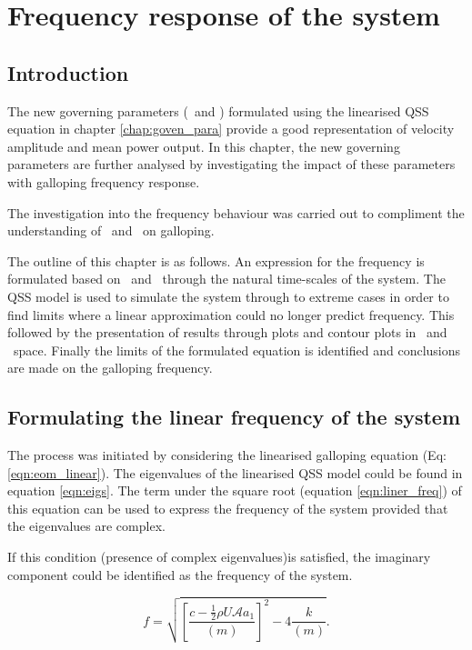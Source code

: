 \chapter{Frequency response of the system}

\section{Introduction}

The new governing parameters (\massstiff\ and \massdamp) formulated using the linearised QSS equation in chapter \ref{chap:goven_para} provide a good representation of velocity amplitude and mean power output. In this chapter, the new governing parameters are further analysed by investigating the impact of these parameters with galloping frequency response. 

The investigation into the frequency behaviour was carried out to compliment the understanding of \massstiff\ and \massdamp\ on galloping. 

The outline of this chapter is as follows. An expression for the frequency is formulated based on \massstiff\ and \massdamp\ through the natural time-scales of the system. The QSS model is used to simulate the system through to  extreme cases in order to find limits where a linear approximation could no longer predict frequency. This followed by the presentation of results through plots and contour plots in \massstiff\ and \massdamp\ space. Finally the limits of the formulated equation is identified and conclusions are made on the galloping frequency. 


\vspace{15mm}

\section{Formulating the linear frequency of the system}

The process was initiated by considering the linearised galloping equation (Eq:\ref{eqn:eom_linear}). The eigenvalues of the linearised QSS model could be found in equation \ref{eqn:eigs}. The term under the square root (equation \ref{eqn:liner_freq}) of this equation can be used to express the frequency of the system provided that the eigenvalues are complex. 

If this condition (presence of complex eigenvalues)is satisfied, the imaginary component could be identified as the frequency of the system. 

\begin{equation}
\label{eqn:liner_freq}
f = \sqrt{\left[\frac{c-\frac{1}{2}\rho U\mathcal{A}a_1}{(m)}\right]^2-4\frac{k}{(m)}}.
\end{equation}



